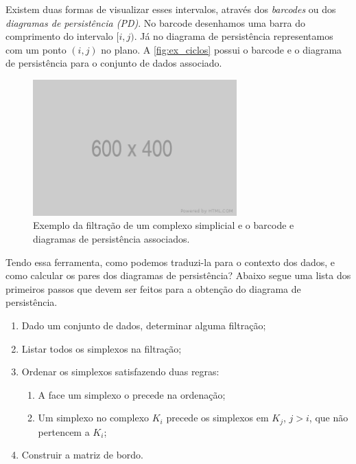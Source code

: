 Existem duas formas de visualizar esses intervalos, através dos
\textit{barcodes} ou dos \textit{diagramas de persistência (PD)}. No barcode
desenhamos uma barra do comprimento do intervalo $[i,j)$. Já no diagrama de
persistência representamos com um ponto $(i,j)$ no plano. A \autoref{fig:ex_ciclos}
possui o barcode e o diagrama de persistência para o conjunto de dados associado.

\begin{figure}[!htpb]
  \centering
  \includegraphics[width=0.7\textwidth]{images/placeholder.png}
  \caption{Exemplo da filtração de um complexo simplicial e o barcode e diagramas
  de persistência associados.}
  \label{fig:ex_ciclos}
  \fautor
\end{figure}

Tendo essa ferramenta, como podemos traduzi-la para o contexto dos dados, e
como calcular os pares dos diagramas de persistência? Abaixo segue uma lista
dos primeiros passos que devem ser feitos para a obtenção do diagrama de persistência.

\begin{enumerate}
  \item Dado um conjunto de dados, determinar alguma filtração;
  \item Listar todos os simplexos na filtração;
  \item Ordenar os simplexos satisfazendo duas regras:
  \begin{enumerate}
    \item A face um simplexo o precede na ordenação;
    \item Um simplexo no complexo $K_i$ precede os simplexos em $K_j$, $j > i$,
    que não pertencem a $K_i$;
  \end{enumerate}
  \item Construir a matriz de bordo.
\end{enumerate}

